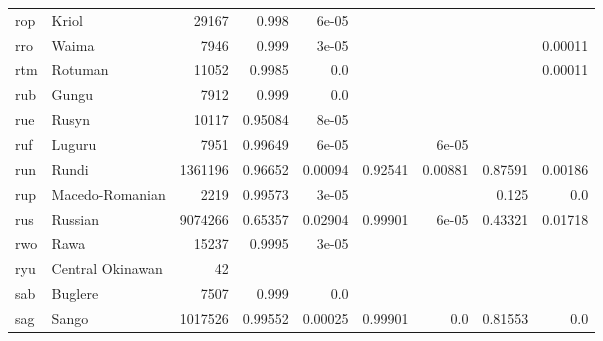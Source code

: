 \documentclass[11pt]{article}
\begin{document}
\begin{table*}[h]
{\begin{tabular}{llrrrrrrr}
rop         & Kriol         & 29167         & 0.998         & 6e-05         &          &          &          &          \\

rro         & Waima         & 7946         & 0.999         & 3e-05         &          &          &          & 0.00011         \\

rtm         & Rotuman         & 11052         & 0.9985         & 0.0         &          &          &          & 0.00011         \\

rub         & Gungu         & 7912         & 0.999         & 0.0         &          &          &          &          \\

rue         & Rusyn         & 10117         & 0.95084         & 8e-05         &          &          &          &          \\

ruf         & Luguru         & 7951         & 0.99649         & 6e-05         &          & 6e-05         &          &          \\

run         & Rundi         & 1361196         & 0.96652         & 0.00094         & 0.92541         & 0.00881         & 0.87591         & 0.00186         \\

rup         & Macedo-Romanian         & 2219         & 0.99573         & 3e-05         &          &          & 0.125         & 0.0         \\

rus         & Russian         & 9074266         & 0.65357         & 0.02904         & 0.99901         & 6e-05         & 0.43321         & 0.01718         \\

rwo         & Rawa         & 15237         & 0.9995         & 3e-05         &          &          &          &          \\

ryu         & Central Okinawan         & 42         &          &          &          &          &          &          \\

sab         & Buglere         & 7507         & 0.999         & 0.0         &          &          &          &          \\

sag         & Sango         & 1017526         & 0.99552         & 0.00025         & 0.99901         & 0.0         & 0.81553         & 0.0         \\


\end{tabular}}
\end{table*}
\end{document}
